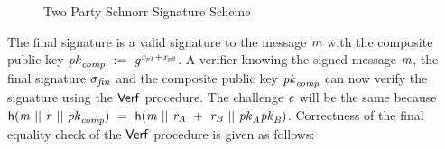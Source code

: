 \begin{figure}
    \label{fig:twoparty-schnorr}
    \fbox{
        \parbox{\textwidth}{
            \procedure[linenumbering, syntaxhighlight=auto]{$\procSetupPartSig{\varSecParam}$}{
                \varNonce \sample \cnstIntegersPrimeWithoutZero{\varPrime} \\
                \varRand \opAssign \funGen{\varRand} \\
                \pcreturn (\varNonce, \varRand)
            }
            \procedure[linenumbering, syntaxhighlight=auto]{$\procGenPartSig{\varMsg}{\varSecKeyAlice}{\varNonceAlice}{\varPubKeyBob}{\varRandBob}$} {
                \varSchnorrChallenge \opAssign \funHash{\varMsg \opConc \varRandAlice \opAdd \varRandBob \opConc \varPubKeyAlice \opAdd \varPubKeyBob} \\
                \varS \opAssign \varNonceAlice \opAdd \varSchnorrChallenge \opMult \varSecKeyAlice \\
                \pcreturn \varSigAlice \opAssign \varS
            } \\[2\baselineskip]
            \procedure[linenumbering, syntaxhighlight=auto]{$\procVerfPartSig{\varMsg}{\varSecKeyAlice}{\varNonceAlice}{\varPubKeyBob}{\varRandBob}{\varSigBob}$} {
                \varSchnorrChallenge \opAssign \funHash{\varMsg \opConc \varRandAlice \opAdd \varRandBob \opConc \varPubKeyAlice \opAdd \varPubKeyBob} \\
                \varS \opAssign \opAccess{\varSigBob}{\varS} \\
                \pcreturn \funGen{\varS} \opEq \varRandBob \opAdd \varSchnorrChallenge \opMult \varPubKeyBob
            } \\[2\baselineskip]
            \procedure[linenumbering, syntaxhighlight=auto]{$\procFinSig{\varSigAlice}{\varSigBob}{\varRandAlice}{\varRandBob}$} {
                \varS_\varAlice \opAssign \opAccess{\varSigAlice}{\varS} \\
                \varS_\varBob \opAssign \opAccess{\varSigBob}{\varS} \\
                \pcreturn \varSigFin \opAssign (\varS \opAssign \varS_\varAlice \opAdd \varS_\varBob \opSeperate \varRand \opAssign \varRandAlice \opAdd \varRandBob)
            }
        }
    }
    \caption{Two Party Schnorr Signature Scheme}
\end{figure}

The final signature is a valid signature to the message $\mathit{m}$ with the composite public key $\mathit{pk}_{\mathit{comp}} ~:=~ \mathit{g}^{\mathit{x}_{\mathit{p1}} + \mathit{x}_{\mathit{p2}}}$.
A verifier knowing the signed message $\mathit{m}$, the final signature $\sigma_{\mathit{fin}}$ and the composite public key $\mathit{pk}_{\mathit{comp}}$ can now verify the signature using the $\mathsf{Verf}$ procedure.
The challenge $\mathit{e}$ will be the same because
$\mathsf{h} (\mathit{m} ~||~ \mathit{r} ~||~ \mathit{pk}_{\mathit{comp}}) ~=~ \mathsf{h} (\mathit{m} ~||~ \mathit{r}_{\mathit{A}} ~+~ \mathit{r}_{\mathit{B}} ~||~ \mathit{pk}_{\mathit{A}} \mathit{pk}_{\mathit{B}})$.
Correctness of the final equality check of the $\mathsf{Verf}$ procedure is given as follows:

